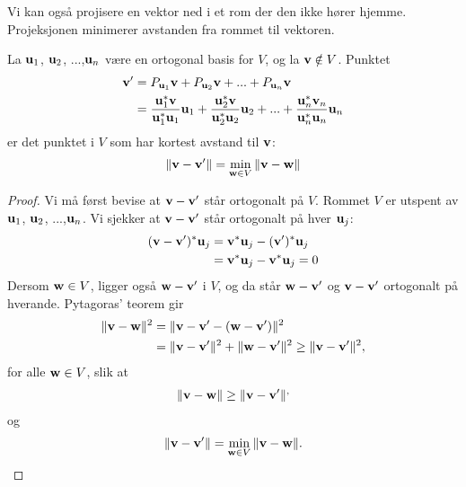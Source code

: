 Vi kan også projisere en vektor ned i et rom der den ikke hører hjemme. 
Projeksjonen minimerer avstanden fra rommet til vektoren.
\begin{thm}
La $\mathbf{u}_1$, $\mathbf{u} _2$, ...,$\mathbf{u}_n$ være en ortogonal basis for $V$, og la $\mathbf{v} \notin V$. Punktet
\begin{align*}
\mathbf{v}'&= P_{\mathbf{u}_1} \mathbf{v} + P_{\mathbf{u}_2} \mathbf{v} + ... +P_{\mathbf{u}_n} \mathbf{v}\\ &= \frac{\mathbf{u}_1^*\mathbf{v}}{\mathbf{u}_1^*\mathbf{u}_1}\mathbf{u}_1 + \frac{\mathbf{u}_2^*\mathbf{v}}{\mathbf{u}_2^*\mathbf{u}_2}\mathbf{u}_2+...+\frac{\mathbf{u}_n^*\mathbf{v}_n}{\mathbf{u}_n^*\mathbf{u}_n}\mathbf{u}_n
\end{align*}
er det punktet i $V$ som har kortest avstand til $\mathbf{v}$:
\[
\|\mathbf{v}-\mathbf{v}' \|=\min_{\mathbf{w} \in V} \|\mathbf{v}-\mathbf{w} \|
\]
\end{thm}
\begin{proof}
Vi må først bevise at $\mathbf{v}-\mathbf{v}'$ står ortogonalt på $V$. 
Rommet $V$ er utspent av $\mathbf{u}_1$, $\mathbf{u} _2$, ...,$\mathbf{u}_n$.
Vi sjekker at $\mathbf{v}-\mathbf{v}'$ står ortogonalt på hver $\mathbf{u}_j$:
\begin{align*}
(\mathbf{v}-\mathbf{v}')^*\mathbf{u}_j&=\mathbf{v}^*\mathbf{u}_j-(\mathbf{v}')^*\mathbf{u}_j \\ &=\mathbf{v}^*\mathbf{u}_j-\mathbf{v}^*\mathbf{u}_j =0
\end{align*}
Dersom $\mathbf{w} \in V$, ligger også $\mathbf{w}-\mathbf{v}'$ i $V$, og da står $\mathbf{w}-\mathbf{v}'$ og $\mathbf{v}-\mathbf{v}'$ ortogonalt på hverande. Pytagoras' teorem gir
\begin{align*}
\|\mathbf{v}-\mathbf{w} \|^2&=\|\mathbf{v}-\mathbf{v}'-(\mathbf{w}-\mathbf{v}') \|^2\\&= \|\mathbf{v}-\mathbf{v}' \|^2 +\|\mathbf{w}-\mathbf{v}' \|^2  \geq  \|\mathbf{v}-\mathbf{v}' \|^2,
\end{align*}
for alle $\mathbf{w} \in V$, slik at 
\begin{align*}
\|\mathbf{v}-\mathbf{w} \| \geq  \|\mathbf{v}-\mathbf{v}' \|^,
\end{align*}
og
\[
\|\mathbf{v}-\mathbf{v}' \|=\min_{\mathbf{w} \in V} \|\mathbf{v}-\mathbf{w} \|.\qedhere
\]
\end{proof}


